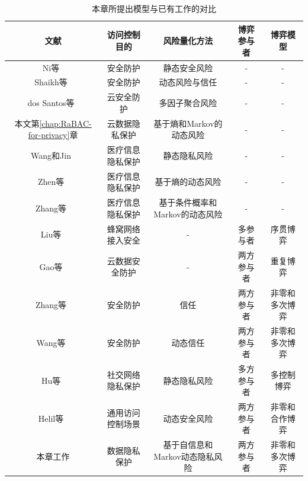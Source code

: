 \begin{table}[htb]
	
	\caption{本章所提出模型与已有工作的对比}\label{tab:comparison}
	\small
	\centering 
	\begin{tabular}{ccccc}
		\toprule
		文献 & 访问控制目的 & 风险量化方法 & 博弈参与者 & 博弈模型 \\
		\hline
		Ni等~\cite{ni2010risk} & 安全防护 &静态安全风险&-&-\\ 
		Shaikh等~\cite{shaikh2012dynamic} & 安全防护 & 动态风险与信任&-&-\\
		dos Santos等~\cite{santos2016framework} &云安全防护 & 多因子聚合风险 &-&-\\
		本文第\ref{chap:RaBAC-for-privacy}章& 云数据隐私保护& 基于熵和Markov的动态风险 & - & -\\
		Wang和Jin~\cite{wang2011quantified} & 医疗信息隐私保护 & 静态隐私风险 &-&-\\
		Zhen等~\cite{zhen2015risk} & 医疗信息隐私保护& 基于熵的动态风险 & - & -\\
		Zhang等~\cite{zhang2018privacy} & 医疗信息隐私保护& 基于条件概率和Markov的动态风险 &-&-\\
		Liu等~\cite{liu2016dynamic} & 蜂窝网络接入安全&-&	多参与者&	序贯博弈\\
		Gao等~\cite{gao2018game} & 云数据安全防护& -&两方参与者&重复博弈\\
		Zhang等~\cite{zhang2015towards} & 安全防护& 信任 & 两方参与者& 非零和多次博弈\\
		Wang等~\cite{wang2019game} & 安全防护& 动态信任 & 两方参与者 & 非零和多次博弈\\
		Hu等~\cite{hu2014game} & 社交网络隐私保护&静态隐私风险&多方参与者&	多控制博弈\\
		Helil等~\cite{helil2017non} & 通用访问控制场景&动态安全风险&两方参与者&非零和合作博弈\\
		本章工作 & 数据隐私保护& 基于自信息和Markov动态隐私风险 & 两方参与者& 非零和多次博弈\\
		\bottomrule 
	\end{tabular}
\end{table}


